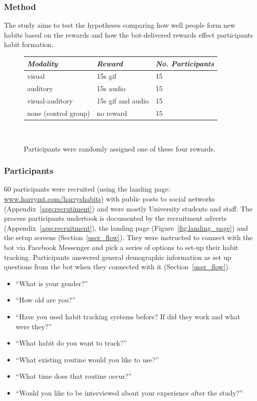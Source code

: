 \subsubsection{Method}
The study aims to test the hypotheses comparing how well people form new habits based on the rewards and how the bot-delivered rewards effect participants habit formation.

\begin{figure}[H]
  \centering
  \begin{tabular}{l l l}
    {\small\textit{Modality}} & {\small \textit{Reward}} & {\small \textit{No. Participants}}  \\ \hline
    visual & 15s gif & 15 \\
    auditory & 15s audio & 15 \\
    visual-auditory & 15s gif and audio & 15 \\
    none (control group) & no reward & 15 \\
  \end{tabular}
  \caption{Participants were randomly assigned one of these four rewards.}~\label{fig:precise_rewards}
\end{figure}

\subsubsection{Participants}
60 participants were recruited (using the landing page: \url{www.harrymt.com/harryshabits}) with public posts to social networks (Appendix~\ref{app:recrutiment}) and were mostly University students and staff. The process participants undertook is documented by the recruitment adverts (Appendix~\ref{app:recruitment}), the landing page (Figure~\ref{fig:landing_page}) and the setup screens (Section~\ref{user_flow}). They were instructed to connect with the bot via Facebook Messenger and pick a series of options to set-up their habit tracking. Participants answered general demographic information as set up questions from the bot when they connected with it (Section~\ref{user_flow}).

\begin{itemize}
  \item ``What is your gender?''
    \item ``How old are you?''
    \item ``Have you used habit tracking systems before? If did they work and what were they?''
    \item ``What habit do you want to track?''
    \item ``What existing routine would you like to use?''
    \item ``What time does that routine occur?''
    \item ``Would you like to be interviewed about your experience after the study?''
\end{itemize}


